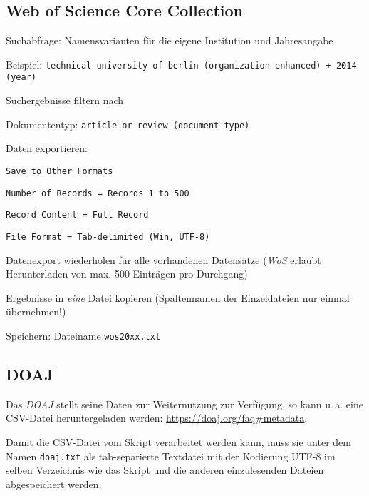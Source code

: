 \subsection*{Web of Science Core Collection}
\begin{compactitem}
\item Suchabfrage: Namensvarianten für die eigene Institution und Jahresangabe 
	\begin{compactitem}
    \item Beispiel: \texttt{technical university of berlin (organization enhanced) + 2014 (year)}
    \end{compactitem}
\item Suchergebnisse filtern nach
	\begin{compactitem}
    \item Dokumententyp: \texttt{article or review (document type)}
    \end{compactitem}
\item Daten exportieren: 
	\begin{compactitem}
	\item \texttt{Save to Other Formats}
    \item \texttt{Number of Records = Records 1 to 500}
    \item \texttt{Record Content = Full Record}
    \item \texttt{File Format = Tab-delimited (Win, UTF-8)}
	\end{compactitem}
\item Datenexport wiederholen für alle vorhandenen Datensätze (\textit{WoS} erlaubt Herunterladen von max. 500 Einträgen pro Durchgang)
\item Ergebnisse in \textit{eine} Datei kopieren (Spaltennamen der Einzeldateien nur einmal übernehmen!)
\item Speichern: Dateiname \texttt{wos20xx.txt}
\end{compactitem}

\subsection*{DOAJ} 
\label{doaj}

Das \textit{DOAJ} stellt seine Daten zur Weiternutzung zur Verfügung, so kann u.\,a. eine CSV-Datei heruntergeladen werden: \url{https://doaj.org/faq#metadata}. 

Damit die CSV-Datei vom Skript verarbeitet werden kann, muss sie unter dem Namen \texttt{doaj.txt} als tab-separierte Textdatei mit der Kodierung UTF-8 im selben Verzeichnis wie das Skript und die anderen einzulesenden Dateien abgespeichert werden.
